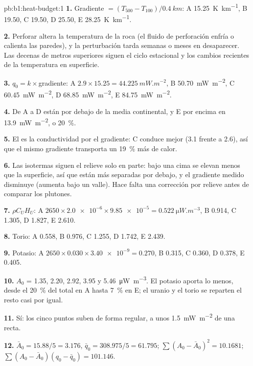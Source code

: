 \begin{solution}{pb:b1:heat-budget:1}
\textbf{1.} Gradiente $= (T_{500} - T_{100})/\qty{0.4}{km}$: A \qty{15.25}{K.km^{-1}},
B \num{19.50}, C \num{19.50}, D \num{25.50}, E \qty{28.25}{K.km^{-1}}.

\textbf{2.} Perforar altera la temperatura de la roca (el fluido de perforación enfría o calienta las paredes), y la perturbación
tarda semanas o meses en desaparecer. Las decenas de metros superiores siguen el ciclo estacional y los cambios recientes de la
temperatura en superficie.

\textbf{3.} $q_0 = k\times$gradiente: A $2.9\times15.25 = \qty{44.225}{mW.m^{-2}}$,
B \qty{50.70}{mW.m^{-2}}, C \qty{60.45}{mW.m^{-2}}, D \qty{68.85}{mW.m^{-2}},
E \qty{84.75}{mW.m^{-2}}.

\textbf{4.} De A a D están por debajo de la media continental, y E por encima en
\qty{13.9}{mW.m^{-2}}, o \qty{20}{\percent}.

\textbf{5.} El  es la conductividad por el gradiente: C conduce mejor (3.1
frente a 2.6), así que el mismo gradiente transporta un \qty{19}{\percent} más de calor.

\textbf{6.} Las isotermas siguen el relieve solo en parte: bajo una cima se elevan menos que la superficie, así que están más
separadas por debajo, y el gradiente medido disminuye (aumenta bajo un valle). Hace falta una corrección por relieve antes de
comparar los plutones.

\textbf{7.} $\rho C_U H_U$: A $2650\times\num{2.0e-6}\times\num{9.85e-5} =
\qty{0.522}{\micro W.m^{-3}}$, B 0.914, C 1.305, D 1.827, E 2.610.

\textbf{8.} Torio: A 0.558, B 0.976, C 1.255, D 1.742, E 2.439.

\textbf{9.} Potasio: A $2650\times0.030\times\num{3.40e-9} = 0.270$, B 0.315,
C 0.360, D 0.378, E 0.405.

\textbf{10.} $A_0$ = 1.35, 2.20, 2.92, 3.95 y \qty{5.46}{\micro W.m^{-3}}.
El potasio aporta lo menos, desde el \qty{20}{\percent} del total en A hasta
\qty{7}{\percent} en E; el uranio y el torio se reparten el resto casi por igual.

\textbf{11.} Sí: los cinco puntos suben de forma regular, a unos
\qty{1.5}{mW.m^{-2}} de una recta.

\textbf{12.} $\bar A_0 = 15.88/5 = 3.176$, $\bar q_0 = 308.975/5 = 61.795$;
$\sum(A_0 - \bar A_0)^2 = 10.1681$; $\sum(A_0 - \bar A_0)(q_0 - \bar q_0) =
101.146$.


\end{solution}
